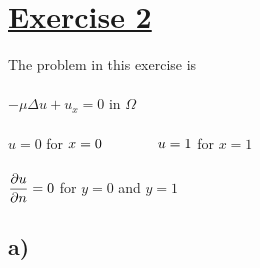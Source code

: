 \documentclass[a4paper,english,12pt,twoside]{article}
\newcommand{\tab}{\hspace*{2em}}
\begin{document}
\newpage

\section*{\underline{Exercise 2}}

The problem in this exercise is\\
\\
$\displaystyle -\mu\Delta u + u_x = 0$ in $\Omega$\\
\\
$u = 0$ for $x = 0 \tab\tab u = 1$ for $x = 1$\\
\\
$\displaystyle \frac{\partial u}{\partial n} = 0$ for $y = 0$ and $y =1$\\

\subsection*{a)}
\end{document}
